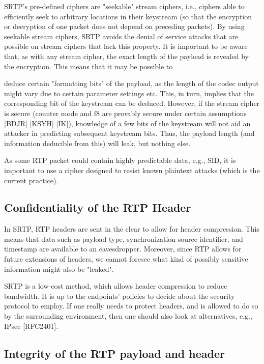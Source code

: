 \documentclass{article}
\begin{document}
SRTP's pre-defined ciphers are "seekable" stream ciphers, i.e., ciphers able to efficiently seek to arbitrary locations in their keystream (so that the encryption or decryption of one packet does not depend on preceding packets).  By using seekable stream ciphers, SRTP avoids the denial of service attacks that are possible on stream ciphers that lack this property.  It is important to be aware that, as with any stream cipher, the exact length of the payload is revealed by the encryption.  This means that it may be possible to

deduce certain "formatting bits" of the payload, as the length of the codec output might vary due to certain parameter settings etc.  This, in turn, implies that the corresponding bit of the keystream can be deduced.  However, if the stream cipher is secure (counter mode and f8 are provably secure under certain assumptions [BDJR] [KSYH] [IK]), knowledge of a few bits of the keystream will not aid an attacker in predicting subsequent keystream bits.  Thus, the payload length (and information deducible from this) will leak, but nothing else.

As some RTP packet could contain highly predictable data, e.g., SID, it is important to use a cipher designed to resist known plaintext attacks (which is the current practice).

\subsection{Confidentiality of the RTP Header}

In SRTP, RTP headers are sent in the clear to allow for header compression.  This means that data such as payload type, synchronization source identifier, and timestamp are available to an eavesdropper.  Moreover, since RTP allows for future extensions of headers, we cannot foresee what kind of possibly sensitive information might also be "leaked".

SRTP is a low-cost method, which allows header compression to reduce bandwidth.  It is up to the endpoints' policies to decide about the security protocol to employ.  If one really needs to protect headers, and is allowed to do so by the surrounding environment, then one should also look at alternatives, e.g., IPsec [RFC2401].

\subsection{Integrity of the RTP payload and header}
\end{document}
